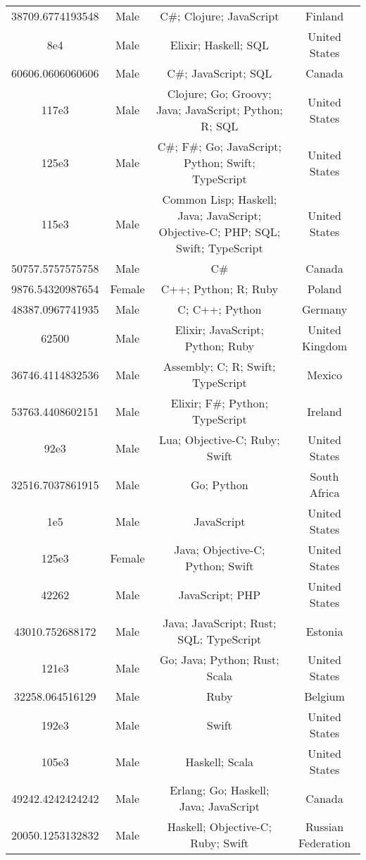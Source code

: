 \begin{center}
\begin{tabular}{ |c|c|c|c| }
38709.6774193548  &  Male  &  C\#; Clojure; JavaScript  &  Finland  \\ 
8e4  &  Male  &  Elixir; Haskell; SQL  &  United States  \\ 
60606.0606060606  &  Male  &  C\#; JavaScript; SQL  &  Canada  \\ 
117e3  &  Male  &  Clojure; Go; Groovy; Java; JavaScript; Python; R; SQL  &  United States  \\ 
125e3  &  Male  &  C\#; F\#; Go; JavaScript; Python; Swift; TypeScript  &  United States  \\ 
115e3  &  Male  &  Common Lisp; Haskell; Java; JavaScript; Objective-C; PHP; SQL; Swift; TypeScript  &  United States  \\ 
50757.5757575758  &  Male  &  C\#  &  Canada  \\ 
9876.54320987654  &  Female  &  C++; Python; R; Ruby  &  Poland  \\ 
48387.0967741935  &  Male  &  C; C++; Python  &  Germany  \\ 
62500  &  Male  &  Elixir; JavaScript; Python; Ruby  &  United Kingdom  \\ 
36746.4114832536  &  Male  &  Assembly; C; R; Swift; TypeScript  &  Mexico  \\ 
53763.4408602151  &  Male  &  Elixir; F\#; Python; TypeScript  &  Ireland  \\ 
92e3  &  Male  &  Lua; Objective-C; Ruby; Swift  &  United States  \\ 
32516.7037861915  &  Male  &  Go; Python  &  South Africa  \\ 
1e5  &  Male  &  JavaScript  &  United States  \\ 
125e3  &  Female  &  Java; Objective-C; Python; Swift  &  United States  \\ 
42262  &  Male  &  JavaScript; PHP  &  United States  \\ 
43010.752688172  &  Male  &  Java; JavaScript; Rust; SQL; TypeScript  &  Estonia  \\ 
121e3  &  Male  &  Go; Java; Python; Rust; Scala  &  United States  \\ 
32258.064516129  &  Male  &  Ruby  &  Belgium  \\ 
192e3  &  Male  &  Swift  &  United States  \\ 
105e3  &  Male  &  Haskell; Scala  &  United States  \\ 
49242.4242424242  &  Male  &  Erlang; Go; Haskell; Java; JavaScript  &  Canada  \\ 
20050.1253132832  &  Male  &  Haskell; Objective-C; Ruby; Swift  &  Russian Federation  \\ 

\end{tabular}
\end{center}
